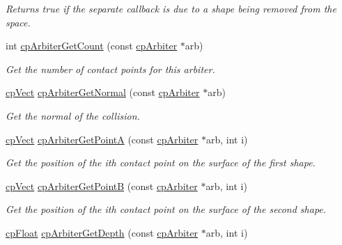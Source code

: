 \begin{DoxyCompactItemize}
\begin{DoxyCompactList}\small\item\em Returns true if the separate callback is due to a shape being removed from the space. \end{DoxyCompactList}\item 
\hypertarget{group__cp_arbiter_gad9422ed6f170a552d00105b83c587827}{}int \hyperlink{group__cp_arbiter_gad9422ed6f170a552d00105b83c587827}{cp\+Arbiter\+Get\+Count} (const \hyperlink{structcp_arbiter}{cp\+Arbiter} $\ast$arb)\label{group__cp_arbiter_gad9422ed6f170a552d00105b83c587827}

\begin{DoxyCompactList}\small\item\em Get the number of contact points for this arbiter. \end{DoxyCompactList}\item 
\hypertarget{group__cp_arbiter_gaa89bedd9c76d33dab137f548eced305a}{}\hyperlink{structcp_vect}{cp\+Vect} \hyperlink{group__cp_arbiter_gaa89bedd9c76d33dab137f548eced305a}{cp\+Arbiter\+Get\+Normal} (const \hyperlink{structcp_arbiter}{cp\+Arbiter} $\ast$arb)\label{group__cp_arbiter_gaa89bedd9c76d33dab137f548eced305a}

\begin{DoxyCompactList}\small\item\em Get the normal of the collision. \end{DoxyCompactList}\item 
\hypertarget{group__cp_arbiter_ga86b3fe34acafb5da7534f65bbc5c9eec}{}\hyperlink{structcp_vect}{cp\+Vect} \hyperlink{group__cp_arbiter_ga86b3fe34acafb5da7534f65bbc5c9eec}{cp\+Arbiter\+Get\+Point\+A} (const \hyperlink{structcp_arbiter}{cp\+Arbiter} $\ast$arb, int i)\label{group__cp_arbiter_ga86b3fe34acafb5da7534f65bbc5c9eec}

\begin{DoxyCompactList}\small\item\em Get the position of the {\ttfamily ith} contact point on the surface of the first shape. \end{DoxyCompactList}\item 
\hypertarget{group__cp_arbiter_gac764f74c64d2a6d62e8f907b5172ab07}{}\hyperlink{structcp_vect}{cp\+Vect} \hyperlink{group__cp_arbiter_gac764f74c64d2a6d62e8f907b5172ab07}{cp\+Arbiter\+Get\+Point\+B} (const \hyperlink{structcp_arbiter}{cp\+Arbiter} $\ast$arb, int i)\label{group__cp_arbiter_gac764f74c64d2a6d62e8f907b5172ab07}

\begin{DoxyCompactList}\small\item\em Get the position of the {\ttfamily ith} contact point on the surface of the second shape. \end{DoxyCompactList}\item 
\hypertarget{group__cp_arbiter_ga1f06a3ea7a1ca61020cec1664887cbee}{}\hyperlink{group__basic_types_gac1ed65573e035bf892505768c852d8d3}{cp\+Float} \hyperlink{group__cp_arbiter_ga1f06a3ea7a1ca61020cec1664887cbee}{cp\+Arbiter\+Get\+Depth} (const \hyperlink{structcp_arbiter}{cp\+Arbiter} $\ast$arb, int i)\label{group__cp_arbiter_ga1f06a3ea7a1ca61020cec1664887cbee}


\end{DoxyCompactItemize}
